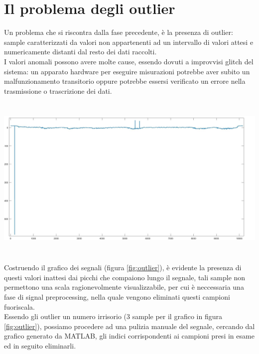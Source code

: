 \documentclass[a4paper, oneside]{book}
\begin{document}
\section{Il problema degli outlier}
Un problema che si riscontra dalla fase precedente, è la presenza di outlier: sample caratterizzati da valori non appartenenti ad un intervallo di valori attesi e numericamente distanti dal resto dei dati raccolti.  \\
I valori anomali possono avere molte cause, essendo dovuti a improvvisi glitch del sistema: un apparato hardware per eseguire misurazioni potrebbe aver subito un malfunzionamento transitorio oppure potrebbe essersi verificato un errore nella trasmissione o trascrizione dei dati. \\
\begin{minipage}{\linewidth}
\begin{center}
\vspace{7mm}
\includegraphics[width=154mm, height= 80mm]{./images/registrazione_tesi/outliers.jpg} 
\label{fig:outlier}
\vspace{7mm}
\end{center}
\end{minipage}
\makebox[\linewidth]{}
Costruendo il grafico dei segnali (figura \ref{fig:outlier}), è evidente la presenza di questi valori inattesi dai picchi che compaiono lungo il segnale, tali sample non permettono una scala ragionevolmente visualizzabile, per cui è neccessaria una fase di signal preprocessing, nella quale vengono eliminati questi campioni fuoriscala. \\
Essendo gli outlier un numero irrisorio (3 sample per il grafico in figura \ref{fig:outlier}), possiamo procedere ad una pulizia manuale del segnale, cercando dal grafico generato da MATLAB, gli indici corrispondenti ai campioni presi in esame ed in seguito eliminarli.
\end{document}
